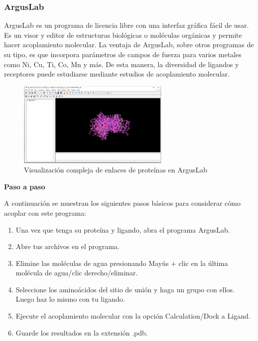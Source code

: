 \documentclass[11pt, letterpaper, spanish]{article}
\begin{document}
{{\subsubsection{ArgusLab}
    \par{ArgusLab es un programa de licencia libre con una interfaz gráfica fácil de usar. Es un visor y editor de estructuras biológicas o moléculas orgánicas y permite hacer acoplamiento molecular. La ventaja de ArgusLab, sobre otros programas de su tipo, es que incorpora parámetros de campos de fuerza para varios metales como Ni, Cu, Ti, Co, Mn y más. De esta manera, la diversidad de ligandos y receptores puede estudiarse mediante estudios de acoplamiento molecular.}
\begin{figure}
	    \centering
		\caption{Visualización compleja de enlaces de proteínas en ArgusLab  \cite{Thompson_2004}}
		\includegraphics[width=0.65\textwidth]{argus}
	\end{figure} 
 \par{\textbf{Paso a paso}}
 \par{A continuación se muestran los siguientes pasos básicos para considerar cómo acoplar con este programa:}
 \begin{enumerate}[1.]
     \item Una vez que tenga su proteína y ligando, abra el programa ArgusLab.
     \item Abre tus archivos en el programa.
     \item Elimine las moléculas de agua presionando Mayús + clic en la última molécula de agua/clic derecho/eliminar.
     \item Seleccione los aminoácidos del sitio de unión y haga un grupo con ellos. Luego haz lo mismo con tu ligando.
     \item Ejecute el acoplamiento molecular con la opción Calculation/Dock a Ligand.
     \item Guarde los resultados en la extensión .pdb.
     \end{enumerate}

}}
\end{document}
